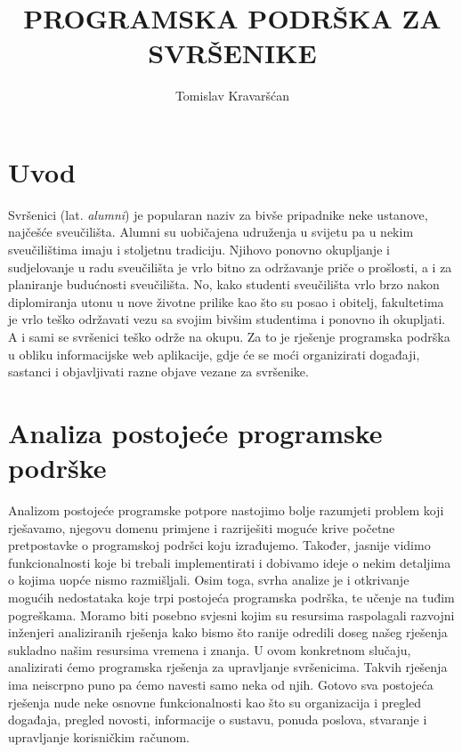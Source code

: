 \documentclass[zavrsni, numeric]{fer}
\begin{document}

\title{PROGRAMSKA PODRŠKA ZA SVRŠENIKE}

\author{Tomislav Kravaršćan}

\maketitle
 
\tableofcontents

\chapter{Uvod}
Svršenici (lat. \textit{alumni}) je popularan naziv za bivše pripadnike neke ustanove, najčešće sveučilišta. Alumni su uobičajena udruženja u svijetu pa u nekim sveučilištima imaju i stoljetnu tradiciju. Njihovo ponovno okupljanje i sudjelovanje u radu sveučilišta je vrlo bitno za održavanje priče o prošlosti, a i za planiranje budućnosti sveučilišta. No, kako studenti sveučilišta vrlo brzo nakon diplomiranja utonu u nove životne prilike kao što su posao i obitelj, fakultetima je vrlo teško održavati vezu sa svojim bivšim studentima i ponovno ih okupljati. A i sami se svršenici teško održe na okupu. Za to je rješenje programska podrška u obliku informacijske web aplikacije, gdje će se moći organizirati događaji, sastanci i objavljivati razne objave vezane za svršenike.

\chapter{Analiza postojeće programske podrške}
Analizom postojeće programske potpore nastojimo bolje razumjeti problem koji rješavamo, njegovu domenu primjene i razriješiti moguće krive početne pretpostavke o programskoj podršci koju izrađujemo. Također, jasnije vidimo funkcionalnosti koje bi trebali implementirati i dobivamo ideje o nekim detaljima o kojima uopće nismo razmišljali. Osim toga, svrha analize je i otkrivanje mogućih nedostataka koje trpi postojeća programska podrška, te učenje na tuđim pogreškama. Moramo biti posebno svjesni kojim su resursima raspolagali razvojni inženjeri analiziranih rješenja kako bismo što ranije odredili doseg našeg rješenja sukladno našim resursima vremena i znanja.
U ovom konkretnom slučaju, analizirati ćemo programska rješenja za upravljanje svršenicima. Takvih rješenja ima neiscrpno puno pa ćemo navesti samo neka od njih. Gotovo sva postojeća rješenja nude neke osnovne funkcionalnosti kao što su organizacija i pregled događaja, pregled novosti, informacije o sustavu, ponuda poslova, stvaranje i upravljanje korisničkim računom.
\end{document}

